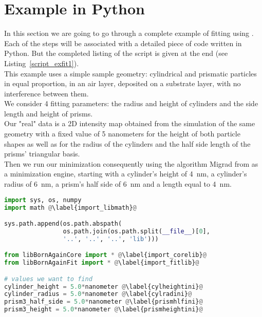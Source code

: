 \section{Example in Python}
In this section we are going to go through a complete example of
fitting using \BornAgain. Each of the steps will be associated with a
detailed piece of code written in Python. But the completed listing of
the script is given at the end (see Listing~\ref{script_exfit1}).\\

This example uses a simple sample geometry: cylindrical and
prismatic particles in equal proportion, in an air layer, deposited on a substrate layer, with no interference
between them.\\ We consider 4 fitting parameters: the radius and height of cylinders and the
side length and height of prisms.\\  Our "real" data is a 2D intensity
map obtained from the simulation of the same geometry with a fixed
value of 5 nanometers for the height of both particle shapes as well
as for the radius of the cylinders and the half side length of the
prisms' triangular basis.\\ Then we run our minimization consequently
using the algorithm Migrad from  as a  minimization engine, starting with a cylinder's height
of 4~nm, a cylinder's radius of 6~nm, a prism's half side of 6~nm
and a length equal to 4~nm.\\



\begin{lstlisting}[language=python, style=eclipseboxed, name=exfit,nolol]
import sys, os, numpy 
import math @\label{import_libmath}@

sys.path.append(os.path.abspath(
                os.path.join(os.path.split(__file__)[0],
                '..', '..', '..', 'lib')))

from libBornAgainCore import * @\label{import_corelib}@
from libBornAgainFit import * @\label{import_fitlib}@

# values we want to find
cylinder_height = 5.0*nanometer @\label{cylheightini}@
cylinder_radius = 5.0*nanometer @\label{cylradini}@
prism3_half_side = 5.0*nanometer @\label{prismhlfini}@
prism3_height = 5.0*nanometer @\label{prismheightini}@
\end{lstlisting}

